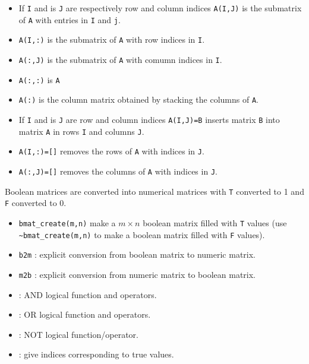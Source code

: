 \begin{itemize}
   \item If \verb+I+ and is \verb+J+ are respectively row and column indices \verb+A(I,J)+ is the submatrix of \verb+A+ with entries in \verb+I+ and \verb+j+.
   \item \verb+A(I,:)+ is the submatrix of \verb+A+ with row indices in \verb+I+.
   \item \verb+A(:,J)+ is the submatrix of \verb+A+ with comumn indices in \verb+I+.
   \item \verb+A(:,:)+ is \verb+A+
   \item \verb+A(:)+  is the column matrix obtained by stacking the columns of \verb+A+.
\end{itemize}
\begin{itemize}
   \item If \verb+I+ and is \verb+J+ are row and column indices \verb+A(I,J)=B+ inserts
matrix \verb+B+ into matrix \verb+A+ in rows \verb+I+ and columns \verb!J!.
   \item \verb+A(I,:)=[]+ removes the rows of \verb+A+ with indices in \verb+J+.
   \item \verb+A(:,J)=[]+ removes the columns of \verb+A+ with indices in \verb+J+.
\end{itemize}


Boolean matrices are converted into numerical matrices with \verb+T+ converted to 1 
and \verb+F+ converted to 0. 

\begin{itemize}
\item \verb+bmat_create(m,n)+ make a $m \times n$ boolean matrix filled with \verb+T+ values
  (use \verb+~bmat_create(m,n)+ to make a boolean matrix filled with \verb+F+ values).
\item \verb+b2m+ : explicit conversion from boolean matrix to numeric matrix.
\item \verb+m2b+ : explicit conversion from numeric matrix to boolean matrix.
\item  {}: AND logical function and operators.
\item  {}: OR logical function and operators.
\item  {}: NOT logical function/operator.
\item  {}: give indices corresponding to true values.

\end{itemize}



